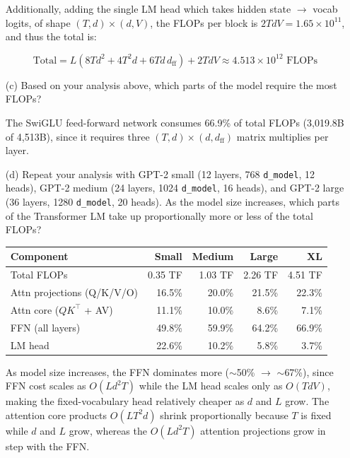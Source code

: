\documentclass[letterpaper]{article}
\begin{document}
\begin{itemize}
	Additionally, adding the single LM head which takes hidden state $\to$ vocab logits, of shape $(T,d)\times(d,V)$, the FLOPs per block is $2TdV = 1.65\times10^{11}$, and thus the total is:

	\[
		\text{Total} = L(8Td^2 + 4T^2d + 6Td\,d_\text{ff}) + 2TdV \approx 4.513\times10^{12}\text{ FLOPs}
	\]

	\item[(c)] Based on your analysis above, which parts of the model require the most FLOPs?

	The SwiGLU feed-forward network consumes 66.9\% of total FLOPs (3,019.8B of 4,513B), since it requires three $(T,d)\times(d,d_\text{ff})$ matrix multiplies per layer. %

	\item[(d)] Repeat your analysis with GPT-2 small (12 layers, 768 \texttt{d\_model}, 12 heads), GPT-2 medium (24 layers, 1024 \texttt{d\_model}, 16 heads), and GPT-2 large (36 layers, 1280 \texttt{d\_model}, 20 heads). As the model size increases, which parts of the Transformer LM take up proportionally more or less of the total FLOPs?

	\begin{center}
	\begin{tabular}{lrrrr}
	\hline
	\textbf{Component} & \textbf{Small} & \textbf{Medium} & \textbf{Large} & \textbf{XL} \\
	\hline
	Total FLOPs & 0.35 TF & 1.03 TF & 2.26 TF & 4.51 TF \\
	\hline
	Attn projections (Q/K/V/O) & 16.5\% & 20.0\% & 21.5\% & 22.3\% \\
	Attn core ($QK^\top$ + AV) & 11.1\% & 10.0\% & 8.6\% & 7.1\% \\
	FFN (all layers) & 49.8\% & 59.9\% & 64.2\% & 66.9\% \\
	LM head & 22.6\% & 10.2\% & 5.8\% & 3.7\% \\
	\hline
	\end{tabular}
	\end{center}

	As model size increases, the FFN dominates more ($\sim$50\% $\to$ $\sim$67\%), since FFN cost scales as $O(Ld^2 T)$ while the LM head scales only as $O(TdV)$, making the fixed-vocabulary head relatively cheaper as $d$ and $L$ grow. The attention core products $O(LT^2d)$ shrink proportionally because $T$ is fixed while $d$ and $L$ grow, whereas the $O(Ld^2 T)$ attention projections grow in step with the FFN.


\end{itemize}
\end{document}
